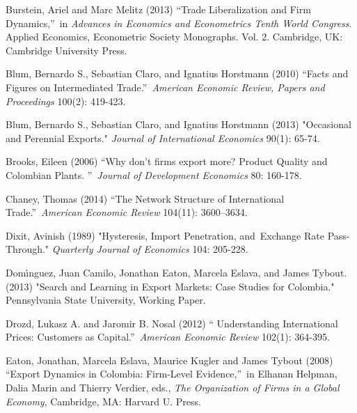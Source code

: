 \documentclass[12pt]{article}
\begin{document}
\begin{description}
\item Burstein, Ariel and Marc Melitz (2013) \textquotedblleft Trade
Liberalization and Firm Dynamics,\textquotedblright\ in \textit{Advances in
Economics and Econometrics Tenth World Congress}. Applied Economics,
Econometric Society Monographs. Vol. 2. Cambridge, UK: Cambridge University
Press.

\item Blum, Bernardo S., Sebastian Claro, and Ignatius Horstmann (2010)
\textquotedblleft Facts and Figures on Intermediated
Trade.\textquotedblright\ \textit{American Economic Review, Papers and
Proceedings} 100(2): 419-423.

\item Blum, Bernardo S., Sebastian Claro, and Ignatius Horstmann (2013)
"Occasional and Perennial Exports." \textit{Journal of International
Economics} 90(1): 65-74.

\item Brooks, Eileen (2006) \textquotedblleft Why don't firms export more?
Product Quality and Colombian Plants. \textquotedblright\ \textit{Journal of
Development Economics} 80: 160-178.

\item Chaney, Thomas (2014) \textquotedblleft The Network Structure of
International Trade.\textquotedblright\ \textit{American Economic Review}
104(11): 3600--3634.

\item Dixit, Avinish (1989) "Hysteresis, Import Penetration, and\ Exchange
Rate Pass-Through." \textit{Quarterly Journal of Economics} 104: 205-228.

\item Dom\'{\i}nguez, Juan Camilo, Jonathan Eaton, Marcela Eslava, and James
Tybout. (2013) "Search and Learning in Export Markets: Case Studies for
Colombia." Pennsylvania State University, Working Paper.

\item Drozd, Lukasz A. and Jaromir B. Nosal (2012) \textquotedblleft
Understanding International Prices: Customers as Capital.\textquotedblright\ 
\textit{American Economic Review} 102(1): 364-395.

\item Eaton, Jonathan, Marcela Eslava, Maurice Kugler and James Tybout
(2008) \textquotedblleft Export Dynamics in Colombia: Firm-Level
Evidence,\textquotedblright\ in Elhanan Helpman, Dalia Marin and Thierry
Verdier, eds., \textit{The Organization of Firms in a Global Economy},
Cambridge, MA: Harvard U. Press.


\end{description}
\end{document}
